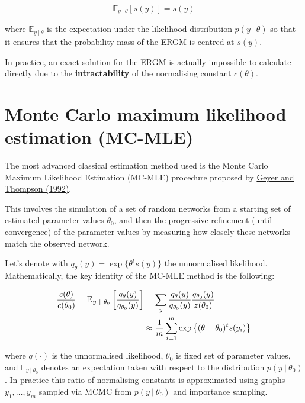 \documentclass[]{book}
\begin{document}
\begin{equation*}
\mathbb{E}_{y\ |\ \theta}\left[s(y)\right] = s(y)
\end{equation*}

where \(\mathbb{E}_{y\ |\ \theta}\) is the expectation under the
likelihood distribution \(p(y\ |\ \theta)\) so that it ensures that the
probability mass of the ERGM is centred at \(s(y)\).

In practice, an exact solution for the ERGM is actually impossible to
calculate directly due to the \textbf{intractability} of the normalising
constant \(c(\theta)\).

\section{Monte Carlo maximum likelihood estimation
(MC-MLE)}\label{monte-carlo-maximum-likelihood-estimation-mc-mle}

The most advanced classical estimation method used is the Monte Carlo
Maximum Likelihood Estimation (MC-MLE) procedure proposed by
\href{http://www.jstor.org/stable/2345852}{Geyer and Thompson (1992)}.

This involves the simulation of a set of random networks from a starting
set of estimated parameter values \(\theta_0\), and then the progressive
refinement (until convergence) of the parameter values by measuring how
closely these networks match the observed network.

Let's denote with \(q_{\theta}(y) = \exp\{ \theta^t s(y) \}\) the
unnormalised likelihood. Mathematically, the key identity of the MC-MLE
method is the following:

\begin{align}
\frac {c(\theta)} {c(\theta_0)} 
= \mathbb{E}_{y\ |\ \theta_0} 
\left[ 
\frac {q_{\theta}(y)} {q_{\theta_0}(y)} 
\right] 
&= \sum_{y} 
\frac {q_{\theta}(y)} {q_{\theta_0}(y)} 
\frac {q_{\theta_0}(y)} {z(\theta_0)} \label{eqn:key}
\\
&\approx \frac{1}{m}\sum_{i=1}^m \exp\left\{ (\theta-\theta_0)^t s(y_i) \right\}\notag
\end{align}

where \(q(\cdot)\) is the unnormalised likelihood, \(\theta_0\) is fixed
set of parameter values, and \(\mathbb{E}_{y\ |\ \theta_0}\) denotes an
expectation taken with respect to the distribution
\(p(y\ |\ \theta_0)\). In practice this ratio of normalising constants
is approximated using graphs \(y_1,\dots,y_m\) sampled via MCMC from
\(p(y\ |\ \theta_0)\) and importance sampling.
\end{document}
